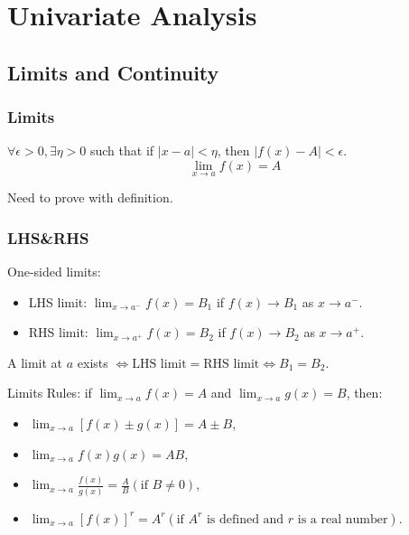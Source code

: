 \section[Univariate Analysis]{Univariate Analysis}

\subsection{Limits and Continuity}

\subsubsection{Limits}

\begin{definition}
    $\forall \epsilon > 0, \exists \eta >0$ such that if $|x - a| < \eta$, then $|f(x) - A| < \epsilon$.
    \begin{equation*}
        \lim_{x \to a} f(x) = A
    \end{equation*}
\end{definition}

\begin{remark*}
    Need to prove with definition.
\end{remark*}


\subsubsection{LHS\&RHS}

\begin{proposition}[$LHS=RHS$]
    One-sided limits:
    \begin{itemize}
        \item LHS limit: $\lim_{x \to a^-} f(x)=B_1$ if $f(x) \to B_1$ as $x \to a^-$.
        \item RHS limit: $\lim_{x \to a^+} f(x)=B_2$ if $f(x) \to B_2$ as $x \to a^+$.
    \end{itemize}
    A limit at $a$ exists $\iff \text{LHS limit} = \text{RHS limit} \iff B_1=B_2$.
\end{proposition}

Limits Rules: if $\lim_{x \to a}f(x)=A $ and $\lim_{x \to a}g(x)=B $, then:
\begin{itemize}
    \item $\lim_{x \to a}[f(x) \pm g(x)] = A \pm B $,
    \item $\lim_{x \to a} f(x)g(x) = AB $,
    \item $\lim_{x \to a}\frac{f(x)}{g(x)} = \frac{A}{B} (\text{if } B \neq 0) $,
    \item $\lim_{x \to a} [f(x)]^r = A^r(\text{if $A^r$ is defined and $r$ is a real number})$.
\end{itemize}


